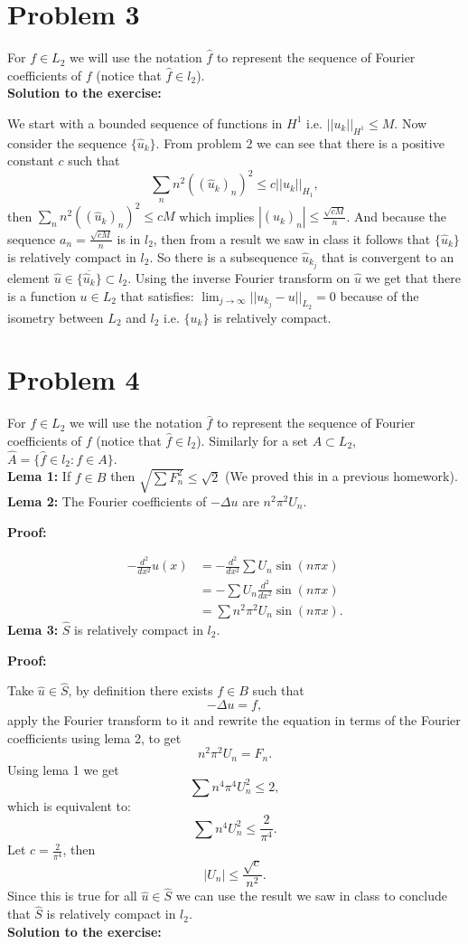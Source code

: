 \documentclass{article}
\begin{document}
\section{Problem 3}
For $f\in L_2$ we will use the notation	$\hat f$ to represent the sequence of
Fourier coefficients of $f$ (notice that $\hat f\in l_2$).\\
\textbf{Solution to the exercise:}

We start with a bounded sequence of functions in $H^1$ i.e. $||u_k||_{H^1}\leq M$.
Now consider the sequence $\{\hat u_k\}$. From problem 2 we can see that there
is a positive constant $c$ such that
\[
	\sum_nn^2((\hat u_k)_n)^2\leq c ||u_k||_{H_1},
\]
then $\sum_nn^2((\hat u_k)_n)^2\leq cM$ which implies $|(\hat u_k)_n|\leq
\frac{\sqrt{cM}}{n}$. And because the sequence $a_n=\frac{\sqrt{cM}}{n}$ is in
$l_2$, then from a result we saw in class it follows that $\{\hat
u_k\}$ is relatively compact in $l_2$. So there is a subsequence
$\hat u_{k_j}$ that is convergent to an element $\hat u\in \overline{\{\hat u_k\}}\subset
l_2$. Using the inverse Fourier transform on $\hat u$ we get that there is a
function $u\in L_2$ that satisfies: $\lim_{j\to\infty}||u_{k_j}-u||_{L_2}=0$
because of the isometry between $L_2$ and $l_2$ i.e. $\{u_k\}$ is relatively
compact.
\section{Problem 4}
For $f\in L_2$ we will use the notation	$\hat f$ to represent the sequence of
Fourier coefficients of $f$ (notice that $\hat f\in l_2$). Similarly for a set
$A\subset L_2$, $\hat A=\{\hat f\in l_2:f\in A\}$.\\
\textbf{Lema 1:} If $f\in B$ then $\sqrt{\sum F_n^2}\leq \sqrt{2}$ (We proved
this in a previous
homework).\\
\textbf{Lema 2:} The Fourier coefficients of $-\Delta u$ are $n^2\pi^2 U_n$.

\textbf{Proof:}

\begin{align*}
	-\frac{d^2}{dx^2}u(x) &= -\frac{d^2}{dx^2}\sum U_n\sin(n\pi x)\\
			      &= -\sum U_n\frac{d^2}{dx^2}\sin(n\pi x)\\
	&= \sum n^2\pi^2U_n\sin(n\pi x).
\end{align*}
\textbf{Lema 3:} $\hat S$ is relatively compact in $l_2$.

\textbf{Proof:}

Take $\hat u\in \hat S$, by definition there exists $f\in B$ such that
\[
	-\Delta u =f,
\]
apply the Fourier transform to it and rewrite the equation in terms
of the Fourier coefficients using lema 2, to get
\[
	n^2\pi^2U_n = F_n.
\]
Using lema 1 we get
\[
	\sum n^4\pi^4U_n^2\leq 2,
\]
which is equivalent to:
\[
\sum n^4U_n^2\leq \frac{2}{\pi^4}.
\]
Let $c=\frac{2}{\pi^4}$, then
\[
	|U_n|\leq \frac{\sqrt{c}}{n^2}.
\]
Since this is true for all $\hat u\in \hat S$ we can use the result
we saw in class to conclude that $\hat S$ is relatively compact in $l_2$.\\
\textbf{Solution to the exercise:}
\end{document}
